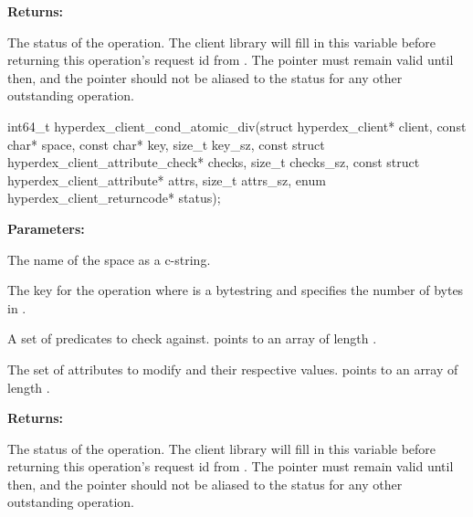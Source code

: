 \noindent\textbf{Returns:}
\begin{description}[labelindent=\widthof{{\code{status}}},leftmargin=*,noitemsep,nolistsep,align=right]
\item[\code{status}] The status of the operation.  The client library will fill in this variable before returning this operation's request id from .  The pointer must remain valid until then, and the pointer should not be aliased to the status for any other outstanding operation.
\end{description}

\funcsep
{}
\begin{ccode}
int64_t hyperdex_client_cond_atomic_div(struct hyperdex_client* client,
                const char* space,
                const char* key, size_t key_sz,
                const struct hyperdex_client_attribute_check* checks, size_t checks_sz,
                const struct hyperdex_client_attribute* attrs, size_t attrs_sz,
                enum hyperdex_client_returncode* status);
\end{ccode}
\funcdesc 

\noindent\textbf{Parameters:}
\begin{description}[labelindent=\widthof{{\code{checks}, \code{checks\_sz}}},leftmargin=*,noitemsep,nolistsep,align=right]
\item[\code{space}] The name of the space as a c-string.
\item[\code{key}, \code{key\_sz}] The key for the operation where  is a bytestring and  specifies the number of bytes in .
\item[\code{checks}, \code{checks\_sz}] A set of predicates to check against.   points to an array of length .
\item[\code{attrs}, \code{attrs\_sz}] The set of attributes to modify and their respective values.   points to an array of length .
\end{description}

\noindent\textbf{Returns:}
\begin{description}[labelindent=\widthof{{\code{status}}},leftmargin=*,noitemsep,nolistsep,align=right]
\item[\code{status}] The status of the operation.  The client library will fill in this variable before returning this operation's request id from .  The pointer must remain valid until then, and the pointer should not be aliased to the status for any other outstanding operation.
\end{description}

